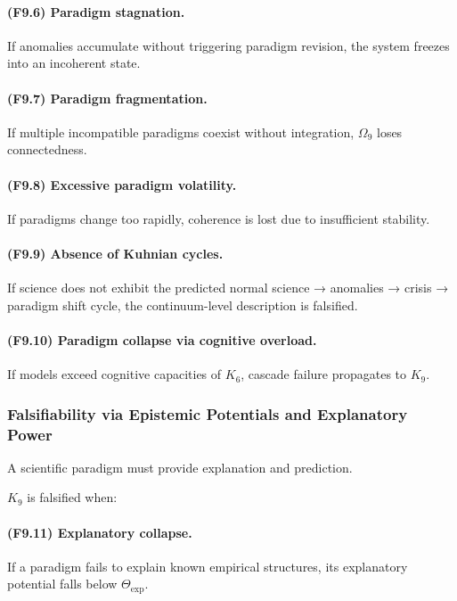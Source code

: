 \paragraph{(F9.6) Paradigm stagnation.}
If anomalies accumulate without triggering paradigm revision,
the system freezes into an incoherent state.

\paragraph{(F9.7) Paradigm fragmentation.}
If multiple incompatible paradigms coexist without integration,
$\Omega_9$ loses connectedness.

\paragraph{(F9.8) Excessive paradigm volatility.}
If paradigms change too rapidly,
coherence is lost due to insufficient stability.

\paragraph{(F9.9) Absence of Kuhnian cycles.}
If science does not exhibit the predicted
normal science → anomalies → crisis → paradigm shift cycle,
the continuum-level description is falsified.

\paragraph{(F9.10) Paradigm collapse via cognitive overload.}
If models exceed cognitive capacities of $K_6$,
cascade failure propagates to $K_9$.



\subsubsection{Falsifiability via Epistemic Potentials and Explanatory Power}

A scientific paradigm must provide explanation and prediction.

$K_9$ is falsified when:

\paragraph{(F9.11) Explanatory collapse.}
If a paradigm fails to explain known empirical structures,
its explanatory potential falls below $\Theta_{\mathrm{exp}}$.

